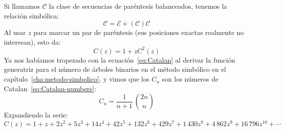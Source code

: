   Si llamamos \(\mathcal{C}\)
  la clase de secuencias de paréntesis balanceados,
  tenemos la relación simbólica:%
  \begin{equation*}
    \mathcal{C}
      = \mathcal{E} + ( \mathcal{C} ) \mathcal{C}
  \end{equation*}
  Al usar \(z\) para marcar un par de paréntesis
  (sus posiciones exactas realmente no interesan),
  esto da:
  \begin{equation}
    \label{eq:Catalan}
    C(z)
      = 1 + z C^2(z)
  \end{equation}
  Ya nos habíamos tropezado con la ecuación~\eqref{eq:Catalan}
  al derivar la función generatriz para el número de árboles binarios
  en el método simbólico en el capítulo~\ref{cha:metodo-simbolico},
  y vimos que los \(C_n\)
  son los números de Catalan~\eqref{eq:Catalan-numbers}:
  \begin{equation*}
    C_n
      = \frac{1}{n + 1} \, \binom{2 n}{n}
  \end{equation*}
  Expandiendo la serie:
  \begin{equation*}
    C(z)
      = 1 + z + 2 z^2 + 5 z^3 + 14 z^4 + 42 z^5 + 132 z^6
	  + 429 z^7 + 1\,430 z^8 + 4\,862  z^9 + 16\,796 z^{10} + \dotsb
  \end{equation*}

